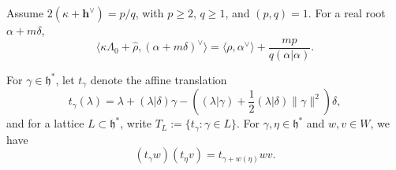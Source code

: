\documentclass[11pt,a4paper]{amsart}
\theoremstyle{plain}
\numberwithin{equation}{section}
\begin{document}
Assume \(2(\kappa+\mathbf{h}^\vee)=p/q\), with
\(p\ge2\), \(q\ge1\), and \((p,q)=1\).
For a real root $\alpha+m\delta$,
\begin{equation}
\langle\kappa\Lambda_0+\widehat\rho,(\alpha+m\delta)^\vee\rangle
=\langle\rho,\alpha^\vee\rangle+\frac{mp}{q(\alpha|\alpha)}.
\label{eq:A-pairing}
\end{equation}

For $\gamma\in\mathfrak h^*$, let $t_\gamma$ denote the affine translation
\begin{equation}
 t_\gamma(\lambda)=\lambda+(\lambda|\delta)\gamma-
\left((\lambda|\gamma)+\frac12(\lambda|\delta)\|\gamma\|^2\right)\delta,
\label{eq:A-trans}
\end{equation}
and for a lattice $L\subset\mathfrak h^*$, write
\(T_L:=\{t_\gamma:\gamma\in L\}\).
For \(\gamma,\eta\in\mathfrak h^*\) and \(w,v\in W\), we have
\begin{equation}
(t_\gamma w)(t_\eta v)=t_{\gamma+w(\eta)}wv.
\label{eq:A-semidirect}
\end{equation}
\end{document}
